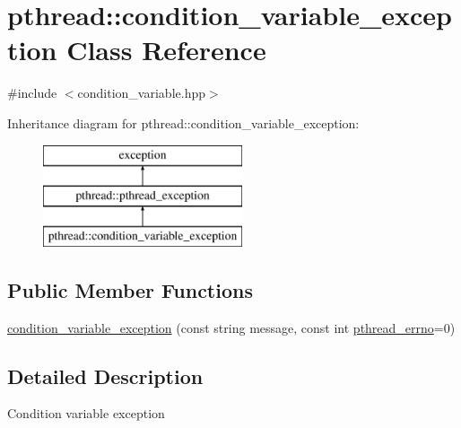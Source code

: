 \hypertarget{classpthread_1_1condition__variable__exception}{\section{pthread\+:\+:condition\+\_\+variable\+\_\+exception Class Reference}
\label{classpthread_1_1condition__variable__exception}
}


{\ttfamily \#include $<$condition\+\_\+variable.\+hpp$>$}

Inheritance diagram for pthread\+:\+:condition\+\_\+variable\+\_\+exception\+:\begin{figure}[H]
\begin{center}
\leavevmode
\includegraphics[height=3.000000cm]{classpthread_1_1condition__variable__exception}
\end{center}
\end{figure}
\subsection*{Public Member Functions}
\begin{DoxyCompactItemize}
\item 
\hyperlink{classpthread_1_1condition__variable__exception_a00dd4b86da3021ae39baff18c6b5e0fc}{condition\+\_\+variable\+\_\+exception} (const string message, const int \hyperlink{classpthread_1_1pthread__exception_a4a869173054faca1945ac1a7729082d6}{pthread\+\_\+errno}=0)
\end{DoxyCompactItemize}


\subsection{Detailed Description}
Condition variable exception 

